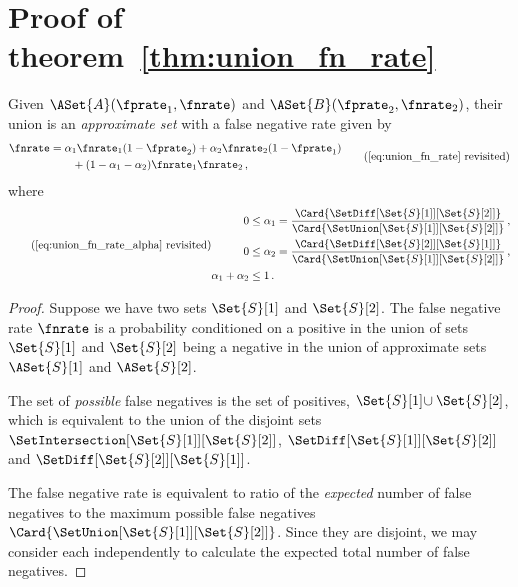 \documentclass[ ../main.tex]{subfiles}
\begin{document}
{\section{Proof of theorem~\ref{thm:union_fn_rate}}
\label{sec:union_fn_rate}
Given $\ASet{A}(\fprate_1,\fnrate)$ and $\ASet{B}(\fprate_2,\fnrate_2)$, their union is an \emph{approximate set} with a false negative rate given by
\begin{equation*}
\begin{split}
    \fnrate &=
        \alpha_1 \fnrate_1(1 - \fprate_2) + \alpha_2 \fnrate_2(1 - \fprate_1)\\
        &\qquad+ (1 - \alpha_1 - \alpha_2) \fnrate_1 \fnrate_2\,,
\end{split}
\tag{\ref{eq:union_fn_rate} revisited}
\end{equation*}
where
\begin{equation*}
\tag{\ref{eq:union_fn_rate_alpha} revisited}
\begin{split}
   0 &\leq \alpha_1 = \frac{\Card{\SetDiff[\Set{S}[1]][\Set{S}[2]]}}{\Card{\SetUnion[\Set{S}[1]][\Set{S}[2]]}}\,,\\
   0 &\leq \alpha_2 = \frac{\Card{\SetDiff[\Set{S}[2]][\Set{S}[1]]}}{\Card{\SetUnion[\Set{S}[1]][\Set{S}[2]]}}\,,\\
   \alpha_1 + \alpha_2 &\leq 1\,.
\end{split}
\end{equation*}
\begin{proof}
Suppose we have two sets $\Set{S}[1]$ and $\Set{S}[2]$. The false negative rate $\fnrate$ is a probability conditioned on a positive in the union of sets $\Set{S}[1]$ and $\Set{S}[2]$ being a negative in the union of approximate sets $\ASet{S}[1]$ and $\ASet{S}[2]$.

The set of \emph{possible} false negatives is the set of positives, $\Set{S}[1] \! \cup \Set{S}[2]$, which is equivalent to the union of the disjoint sets
$\SetIntersection[\Set{S}[1]][\Set{S}[2]]$, $\SetDiff[\Set{S}[1]][\Set{S}[2]]$ and $\SetDiff[\Set{S}[2]][\Set{S}[1]]$.

The false negative rate is equivalent to ratio of the \emph{expected} number of false negatives to the maximum possible false negatives $\Card{\SetUnion[\Set{S}[1]][\Set{S}[2]]}$. Since they are disjoint, we may consider each independently to calculate the expected total number of false negatives.


\end{proof}}
\end{document}
